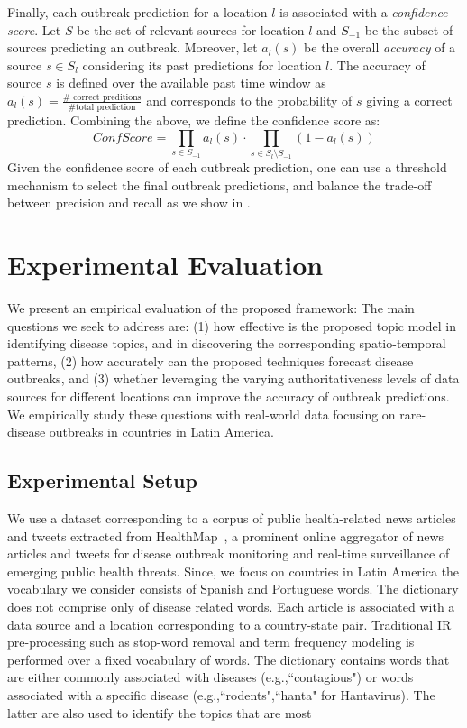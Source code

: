 \documentclass[conference]{IEEEtran}
\begin{document}
Finally, each outbreak prediction for a location $l$ is associated with a {\em confidence score}. Let $S$ be the set of relevant sources for location $l$ and $S_{-1}$ be the subset of sources predicting an outbreak. Moreover, let $a_l(s)$ be the overall {\em accuracy} of a source $s \in S_l$ considering its past predictions for location $l$. The accuracy of source $s$ is defined over the available past time window as $a_l(s) = \frac{\#\mbox{ correct preditions}}{\#\mbox{total prediction}}$ and corresponds to the probability of $s$ giving a correct prediction. Combining the above, we define the confidence score as: 
\begin{equation}
ConfScore = \prod_{s \in S_{-1}}a_l(s) \cdot \prod_{s \in S_l \setminus S_{-1}} (1 - a_l(s))
\label{eq:conf}
\end{equation}
Given the confidence score of each outbreak prediction, one can use a threshold mechanism to select the final outbreak predictions, and balance the trade-off between precision and recall as we show in . 

\section{Experimental Evaluation}
\label{sec:exp}
We present an empirical evaluation of the proposed framework: The main questions we seek to address are: (1) how effective is the proposed topic model in identifying disease topics, and in discovering the corresponding spatio-temporal patterns, (2) how accurately can the proposed techniques forecast disease outbreaks, and (3) whether leveraging the varying authoritativeness levels of data sources for different locations can improve the accuracy of outbreak predictions. We empirically study these questions with real-world data focusing on rare-disease outbreaks in countries in Latin America.

\subsection{Experimental Setup}
 We use a dataset corresponding to a corpus of public health-related news articles and tweets extracted from HealthMap~\cite{healthmap}, a prominent online aggregator of news articles and tweets for disease outbreak monitoring and real-time surveillance of emerging public health threats. Since, we focus on countries in Latin America the vocabulary we consider consists of Spanish and Portuguese words. The dictionary does not comprise only of disease related words.  Each article is associated with a data source and a location corresponding to a country-state pair. Traditional IR pre-processing such as stop-word removal and term frequency modeling is performed over a fixed vocabulary of words. The dictionary contains words that are either commonly associated with diseases (e.g.,``contagious") or words associated with a specific disease (e.g.,``rodents",``hanta" for Hantavirus). The latter are also used to identify the topics that are most 
\end{document}
